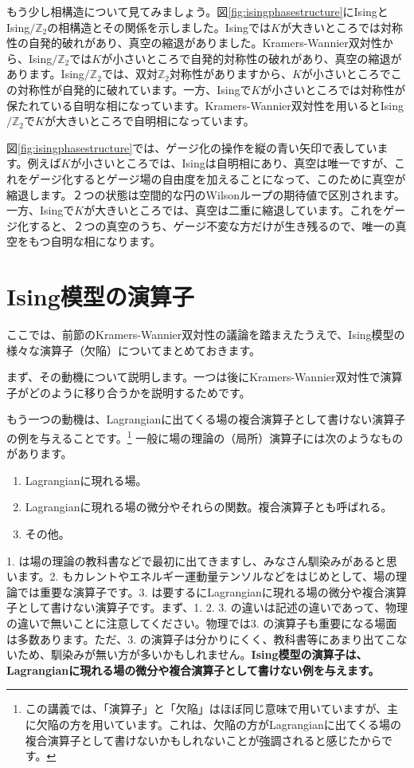 \documentclass[report,paper=a4, fontsize=12pt, line_length=16cm, number_of_lines=33,dvipdfmx]{jlreq}
\newcommand{\kyou}[1]{{\sffamily \bfseries #1}}
\numberwithin{equation}{chapter}
\newcommand{\Zb}{\mathbb{Z}}
\newcommand{\Ising}{\mbox{Ising}}
\newcommand{\gIsing}{\mbox{Ising$/\Zb_2$}}
\begin{document}
もう少し相構造について見てみましょう。図\ref{fig:isingphasestructure}に\Ising と \gIsing の相構造とその関係を示しました。\Ising では$K$が大きいところでは対称性の自発的破れがあり、真空の縮退がありました。Kramers-Wannier双対性から、\gIsing では$K$が小さいところで自発的対称性の破れがあり、真空の縮退があります。\gIsing では、双対$\Zb_2$対称性がありますから、$K$が小さいところでこの対称性が自発的に破れています。一方、\Ising で$K$が小さいところでは対称性が保たれている自明な相になっています。Kramers-Wannier双対性を用いると\gIsing で$K$が大きいところで自明相になっています。

図\ref{fig:isingphasestructure}では、ゲージ化の操作を縦の青い矢印で表しています。例えば$K$が小さいところでは、\Ising は自明相にあり、真空は唯一ですが、これをゲージ化するとゲージ場の自由度を加えることになって、このために真空が縮退します。２つの状態は空間的な円のWilsonループの期待値で区別されます。一方、\Ising で$K$が大きいところでは、真空は二重に縮退しています。これをゲージ化すると、２つの真空のうち、ゲージ不変な方だけが生き残るので、唯一の真空をもつ自明な相になります。

\section{Ising模型の演算子}
ここでは、前節のKramers-Wannier双対性の議論を踏まえたうえで、Ising模型の様々な演算子（欠陥）についてまとめておきます。

まず、その動機について説明します。一つは後にKramers-Wannier双対性で演算子がどのように移り合うかを説明するためです。

もう一つの動機は、Lagrangianに出てくる場の複合演算子として書けない演算子の例を与えることです。\footnote{この講義では、「演算子」と「欠陥」はほぼ同じ意味で用いていますが、主に欠陥の方を用いています。これは、欠陥の方がLagrangianに出てくる場の複合演算子として書けないかもしれないことが強調されると感じたからです。}
一般に場の理論の（局所）演算子には次のようなものがあります。
\begin{enumerate}
  \item Lagrangianに現れる場。
  \item Lagrangianに現れる場の微分やそれらの関数。複合演算子とも呼ばれる。
  \item その他。
\end{enumerate}
1. は場の理論の教科書などで最初に出てきますし、みなさん馴染みがあると思います。2. もカレントやエネルギー運動量テンソルなどをはじめとして、場の理論では重要な演算子です。3. は要するにLagrangianに現れる場の微分や複合演算子として書けない演算子です。まず、1. 2. 3. の違いは記述の違いであって、物理の違いで無いことに注意してください。物理では3. の演算子も重要になる場面は多数あります。ただ、3. の演算子は分かりにくく、教科書等にあまり出てこないため、馴染みが無い方が多いかもしれません。\kyou{Ising模型の演算子は、Lagrangianに現れる場の微分や複合演算子として書けない例を与えます。}
\end{document}
